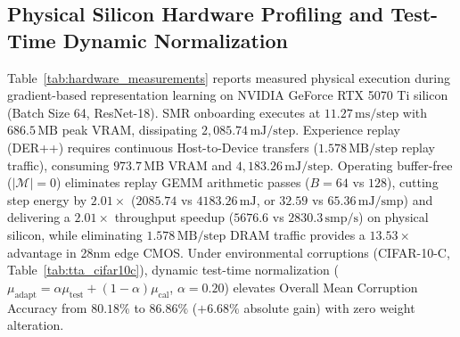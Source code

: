 \documentclass{article}
\begin{document}
\begin{table}[ht]
\centering
\caption{\textbf{Conformal Candidate Triage Latency vs.\ Coverage Trade-Off on Physical GPU Silicon and Edge CPU} ($T=10$ Tasks, Split CIFAR-100).}
\label{tab:conformal_latency_tradeoff}
\vskip 0.005in
\end{table}

\subsection{Physical Silicon Hardware Profiling and Test-Time Dynamic Normalization}
\label{sec:app_hardware_tta}
Table~\ref{tab:hardware_measurements} reports measured physical execution during gradient-based representation learning on NVIDIA GeForce RTX 5070 Ti silicon (Batch Size 64, ResNet-18). SMR onboarding executes at $11.27\,\text{ms/step}$ with $686.5\,\text{MB}$ peak VRAM, dissipating $2{,}085.74\,\text{mJ/step}$. Experience replay (DER++) requires continuous Host-to-Device transfers ($1.578\,\text{MB/step}$ replay traffic), consuming $973.7\,\text{MB}$ VRAM and $4{,}183.26\,\text{mJ/step}$. Operating buffer-free ($|\mathcal{M}|=0$) eliminates replay GEMM arithmetic passes ($B=64$ vs $128$), cutting step energy by $\mathbf{2.01\times}$ ($2085.74$ vs $4183.26\,\text{mJ}$, or $32.59$ vs $65.36\,\text{mJ/smp}$) and delivering a $\mathbf{2.01\times}$ throughput speedup ($5676.6$ vs $2830.3\,\text{smp/s}$) on physical silicon, while eliminating $1.578\,\text{MB/step}$ DRAM traffic provides a $13.53\times$ advantage in 28nm edge CMOS. Under environmental corruptions (CIFAR-10-C, Table~\ref{tab:tta_cifar10c}), dynamic test-time normalization ($\mu_{\text{adapt}} = \alpha \mu_{\text{test}} + (1-\alpha)\mu_{\text{cal}}$, $\alpha=0.20$) elevates Overall Mean Corruption Accuracy from $80.18\%$ to $86.86\%$ ($+6.68\%$ absolute gain) with zero weight alteration.
\end{document}
